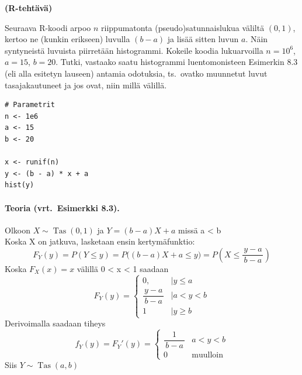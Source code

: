 \documentclass[12pt,a4paper]{article}
\begin{document}
\pagebreak
{}
\textbf{(R-tehtävä)}\\
\begin{kohta}
\item 
Seuraava R-koodi arpoo $n$ riippumatonta 
(pseudo)satunnaislukua väliltä $(0,1)$, kertoo ne (kunkin erikseen)
luvulla $(b-a)$ ja lisää sitten luvun $a$. Näin syntyneistä luvuista
piirretään histogrammi. Kokeile koodia lukuarvoilla $n=10^6$, $a=15$,
$b=20$. Tutki, vastaako saatu histogrammi luentomonisteen Esimerkin 8.3 
(eli alla esitetyn lauseen) antamia 
odotuksia, ts.\ ovatko muunnetut luvut tasajakautuneet ja jos ovat,
niin millä välillä.


\begin{verbatim}
# Parametrit
n <- 1e6
a <- 15
b <- 20

x <- runif(n)
y <- (b - a) * x + a
hist(y)
\end{verbatim}

\paragraph{Teoria (vrt.\ Esimerkki 8.3).}
Olkoon $X\sim\operatorname{Tas}(0,1)$ ja $Y=(b-a)X+a$ missä a < b\\ 
Koska X on jatkuva, lasketaan ensin kertymäfunktio:
\[
F_Y(y)=P(Y\le y)=P\bigl((b-a)X+a\le y\bigr)
= P\!\left(X\le \frac{y-a}{\,b-a\,}\right)
\]
Koska $F_X(x)=x$ välillä 0 < x < 1 saadaan
\[
F_Y(y)=
\begin{cases}
0, &\mid y\le a\\[4pt]
\dfrac{y-a}{\,b-a\,} &\mid a<y<b\\[8pt]
1 &\mid y\ge b
\end{cases}
\]
Derivoimalla saadaan tiheys
\[
f_Y(y)=F_Y'(y)=
\begin{cases}
\dfrac{1}{\,b-a\,} & a<y<b\\[6pt]
0 & \text{muulloin}
\end{cases}
\]
Siis $Y\sim\operatorname{Tas}(a,b)$

\end{kohta}
\end{document}
